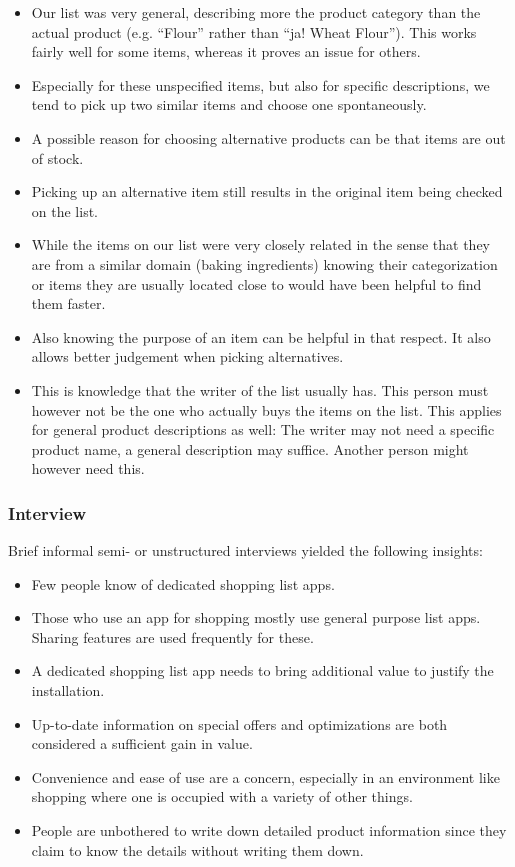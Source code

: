 \documentclass{scrartcl}
\begin{document}
      \begin{itemize}
        \item Our list was very general, describing more the product category than the actual product (e.g. ``Flour'' rather than ``ja! Wheat Flour''). 
          This works fairly well for some items, whereas it proves an issue for others.
        \item Especially for these unspecified items, but also for specific descriptions, we tend to pick up two similar items and choose one spontaneously.
        \item A possible reason for choosing alternative products can be that items are out of stock.
        \item Picking up an alternative item still results in the original item being checked on the list.
        \item While the items on our list were very closely related in the sense that they are from a similar domain (baking ingredients) knowing their categorization or items they are usually located close to would have been helpful to find them faster.
        \item Also knowing the purpose of an item can be helpful in that respect. It also allows better judgement when picking alternatives.
        \item This is knowledge that the writer of the list usually has. This person must however not be the one who actually buys the items on the list.
          This applies for general product descriptions as well: The writer may not need a specific product name, a general description may suffice. 
          Another person might however need this.
      \end{itemize}

    \subsubsection{Interview}
      Brief informal semi- or unstructured interviews yielded the following insights:
      \begin{itemize}
        \item Few people know of dedicated shopping list apps.
        \item Those who use an app for shopping mostly use general purpose list apps. Sharing features are used frequently for these.
        \item A dedicated shopping list app needs to bring additional value to justify the installation.
        \item Up-to-date information on special offers and optimizations are both considered a sufficient gain in value.
        \item Convenience and ease of use are a concern, especially in an environment like shopping where one is occupied with a variety of other things.
        \item People are unbothered to write down detailed product information since they claim to know the details without writing them down.
      \end{itemize}
\end{document}
